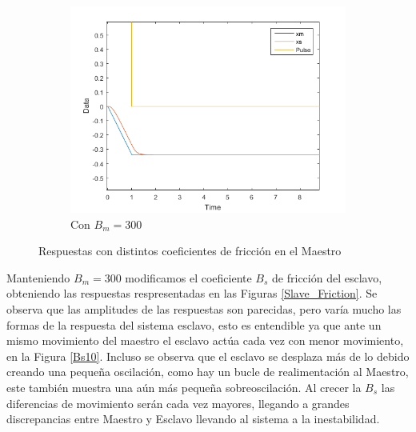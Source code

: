 \documentclass[a4paper, fontsize=11pt]{scrartcl} %
\numberwithin{equation}{section} %
\numberwithin{figure}{section} %
\numberwithin{table}{section} %
\begin{document}
\begin{figure}[h!]
\begin{subfigure}[t]{.5\textwidth}
			\includegraphics[width=1\linewidth]{images/Bm300.PNG}
			\caption{Con $B_m = 300$}
			\label{Bm300}
		\end{subfigure}
		\caption{Respuestas con distintos coeficientes de fricción en el Maestro}
		\label{Master_Friction}
	\end{figure}
	\FloatBarrier
	
	Manteniendo $B_m = 300$ modificamos el coeficiente $B_s$ de fricción del esclavo, obteniendo las respuestas respresentadas en las Figuras \ref{Slave_Friction}. Se observa que las amplitudes de las respuestas son parecidas, pero varía mucho las formas de la respuesta del sistema esclavo, esto es entendible ya que ante un mismo movimiento del maestro el esclavo actúa cada vez con menor movimiento, en la Figura \ref{Bs10}. Incluso se observa que el esclavo se desplaza más de lo debido creando una pequeña oscilación, como hay un bucle de realimentación al Maestro, este también muestra una aún más pequeña sobreoscilación. Al crecer la $B_s$ las diferencias de movimiento serán cada vez mayores, llegando a grandes discrepancias entre Maestro y Esclavo llevando al sistema a la inestabilidad.\\
	
\end{document}
